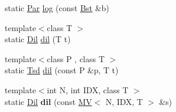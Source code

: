 \begin{DoxyCompactItemize}
\item 
static \hyperlink{namespacevsr_ae046793ece205351429a6346a66fd6eb}{Par} \hyperlink{structvsr_1_1_gen_a6ba66276b10005db0ce9110f0e4e2f69}{log} (const \hyperlink{namespacevsr_a9f737171e19572794ba7b6c12e8e679f}{Bst} \&b)
\item 
{\footnotesize template$<$class T $>$ }\\static \hyperlink{namespacevsr_a541c5c132ce3e7d86080a7e8aebdba5d}{Dil} \hyperlink{structvsr_1_1_gen_acb35464732c9bbfea31b86cf27e60b10}{dil} (T t)
\item 
{\footnotesize template$<$class P , class T $>$ }\\static \hyperlink{namespacevsr_a0d797846780d12bfc3ff831d5b6dcc11}{Tsd} \hyperlink{structvsr_1_1_gen_aa38783e70014aef1b0be543f8b30099e}{dil} (const P \&p, T t)
\item 
\hypertarget{structvsr_1_1_gen_a2dd050d988bfc8539ab3ce692ab6a156}{{\footnotesize template$<$int N, int I\-D\-X, class T $>$ }\\static \hyperlink{namespacevsr_a541c5c132ce3e7d86080a7e8aebdba5d}{Dil} {\bfseries dil} (const \hyperlink{classvsr_1_1_m_v}{M\-V}$<$ N, I\-D\-X, T $>$ \&s)}\label{structvsr_1_1_gen_a2dd050d988bfc8539ab3ce692ab6a156}

\end{DoxyCompactItemize}


